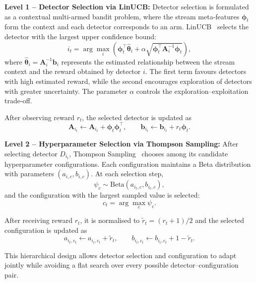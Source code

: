 \documentclass[conference]{IEEEtran}
\begin{document}
\textbf{Level 1 -- Detector Selection via LinUCB:}
Detector selection is formulated as a contextual multi-armed bandit problem, where the stream meta-features $\boldsymbol{\phi}_t$ form the context and each detector corresponds to an arm. LinUCB~\cite{Li2010LinUCB} selects the detector with the largest upper confidence bound:
\begin{equation}
\label{eq:linucb}
i_t =
\arg\max_i
\left(
\boldsymbol{\phi}_t^\top\hat{\boldsymbol{\theta}}_i
+
\alpha
\sqrt{
\boldsymbol{\phi}_t^\top
\mathbf{A}_i^{-1}
\boldsymbol{\phi}_t
}
\right),
\end{equation}
where
$\hat{\boldsymbol{\theta}}_i=\mathbf{A}_i^{-1}\mathbf{b}_i$
represents the estimated relationship between the stream context and the reward obtained by detector $i$. The first term favours detectors with high estimated reward, while the second encourages exploration of detectors with greater uncertainty. The parameter $\alpha$ controls the exploration--exploitation trade-off.

After observing reward $r_t$, the selected detector is updated as
\begin{equation}
\mathbf{A}_{i_t}
\gets
\mathbf{A}_{i_t}
+
\boldsymbol{\phi}_t\boldsymbol{\phi}_t^\top,
\qquad
\mathbf{b}_{i_t}
\gets
\mathbf{b}_{i_t}
+
r_t\boldsymbol{\phi}_t.
\end{equation}

\textbf{Level 2 -- Hyperparameter Selection via Thompson Sampling:}
After selecting detector $D_{i_t}$, Thompson Sampling~\cite{Agrawal2012Thompson} chooses among its candidate hyperparameter configurations. Each configuration maintains a Beta distribution with parameters $(a_{i,c},b_{i,c})$. At each selection step,
\begin{equation}
\label{eq:ts_sample}
\psi_c
\sim
\mathrm{Beta}(a_{i_t,c},b_{i_t,c}),
\end{equation}
and the configuration with the largest sampled value is selected:
\begin{equation}
\label{eq:ts_select}
c_t=\arg\max_c \psi_c.
\end{equation}

After receiving reward $r_t$, it is normalised to
$\tilde{r}_t=(r_t+1)/2$ and the selected configuration is updated as
\begin{equation}
\label{eq:ts_update}
a_{i_t,c_t}
\gets
a_{i_t,c_t}+\tilde{r}_t,
\qquad
b_{i_t,c_t}
\gets
b_{i_t,c_t}+1-\tilde{r}_t.
\end{equation}

This hierarchical design allows detector selection and configuration to adapt jointly while avoiding a flat search over every possible detector--configuration pair.
\end{document}
